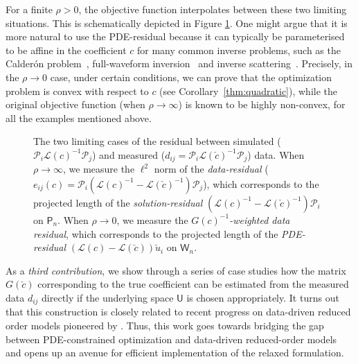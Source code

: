\documentclass[12pt]{amsart}
\begin{document}
For a finite $\rho > 0$, the objective function interpolates between these two limiting situations. This is schematically depicted in Figure \ref{fig:one}. One might argue that it is more natural to use the PDE-residual because it can typically be parameterised to be affine in the coefficient $c$ for many common inverse problems, such as the Calder\'on problem~\cite{uhlmann2009electrical}, full-waveform inversion~\cite{van2015penalty} and inverse scattering~\cite{cakoni2005qualitative}. Precisely, in the $\rho\rightarrow 0$ case, under certain conditions, we can prove that the optimization problem is convex with respect to $c$ (see Corollary~\ref{thm:quadratic}), while the original objective function (when $\rho \rightarrow \infty$) is known to be highly non-convex, for all the examples mentioned above. 
\begin{figure}
\caption{\label{fig:one}
The two limiting cases of the residual between simulated ($\mathcal{P}_i\mathcal{L}(c)^{-1}\mathcal{P}_j$) and measured ($d_{ij}=\mathcal{P}_i\mathcal{L}(\check{c})^{-1}\mathcal{P}_j$) data. When $\rho\rightarrow\infty$, we measure the $\ell^2$ norm of the \emph{data-residual}  ($e_{ij}(c) = \mathcal{P}_i\left(\mathcal{L}(c)^{-1} - \mathcal{L}(\check{c})^{-1}\right)\mathcal{P}_j$), which corresponds to the projected length of the \emph{solution-residual} $\left(\mathcal{L}(c)^{-1}- \mathcal{L}(\check{c})^{-1}\right)\mathcal{P}_i$ on $\mathsf{P}_n$. When $\rho\rightarrow 0$, we measure the \emph{$G(c)^{-1}$-weighted data residual}, which corresponds to the projected length of the \emph{PDE-residual} $\left(\mathcal{L}(c)-\mathcal{L}(\check{c})\right)\check{u}_i$ on  $\mathsf{W}_n $.}
\end{figure}

As a \emph{third contribution}, we show through a series of case studies how the matrix $G(\check{c})$ corresponding to the true coefficient can be estimated from the measured data $d_{ij}$ directly if the underlying space $\mathsf{U}$ is chosen appropriately. It turns out that this construction is closely related to recent progress on data-driven reduced order models pioneered by \cite{Borcea2018,Borcea2020,borcea2022waveform}.
Thus, this work goes towards bridging the gap between PDE-constrained optimization and data-driven reduced-order models and opens up an avenue for efficient implementation of the relaxed formulation.
\end{document}

